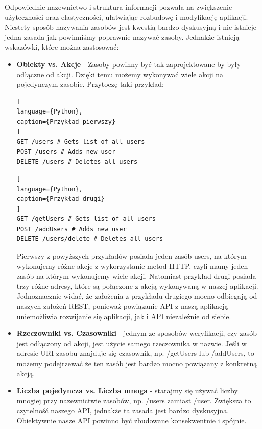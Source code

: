 \documentclass[oneside,polski,logo,indent]{amuthesis}
\begin{document}
Odpowiednie nazewnictwo i struktura informacji pozwala na zwiększenie użyteczności oraz elastyczności, ułatwiając rozbudowę i modyfikację aplikacji. Niestety sposób nazywania zasobów jest kwestią bardzo dyskusyjną i nie istnieje jedna zasada jak powinniśmy poprawnie nazywać zasoby. Jednakże istnieją wskazówki, które można zastosować:\newline
\begin{itemize}
\item \textbf{Obiekty vs. Akcje} - Zasoby powinny być tak zaprojektowane by były odłączne od akcji. Dzięki temu możemy wykonywać wiele akcji na pojedynczym zasobie. Przytoczę taki przykład:\newline

\begin{lstlisting}[
language={Python},
caption={Przykład pierwszy}
]
GET /users # Gets list of all users
POST /users # Adds new user
DELETE /users # Deletes all users
\end{lstlisting}

\begin{lstlisting}[
language={Python},
caption={Przykład drugi}
]
GET /getUsers # Gets list of all users
POST /addUsers # Adds new user
DELETE /users/delete # Deletes all users
\end{lstlisting}

Pierwszy z powyższych przykładów posiada jeden zasób users, na którym wykonujemy różne akcje z wykorzystanie metod HTTP, czyli mamy jeden zasób na którym wykonujemy wiele akcji. Natomiast przykład drugi posiada trzy różne adresy, które są połączone z akcją wykonywaną w naszej aplikacji. Jednoznacznie widać, że założenia z przykładu drugiego mocno odbiegają od naszych założeń REST, ponieważ powiązanie API z naszą aplikacją uniemożliwia rozwijanie się aplikacji, jak i API niezależnie od siebie.\newline
\item \textbf{Rzeczowniki vs. Czasowniki} - jednym ze sposobów weryfikacji, czy zasób jest odłączony od akcji, jest użycie samego rzeczownika w nazwie. Jeśli w adresie URI zasobu znajduje się czasownik, np. /getUsers lub /addUsers, to możemy podejrzewać że ten zasób jest bardzo mocno powiązany z konkretną akcją.\newline
\item \textbf{Liczba pojedyncza vs. Liczba mnoga} - starajmy się używać liczby mnogiej przy nazewnictwie zasobów, np. /users zamiast /user. Zwiększa to czytelność naszego API, jednakże ta zasada jest bardzo dyskusyjna. Obiektywnie nasze API powinno być zbudowane konsekwentnie i spójnie. 
\end{itemize}
\end{document}

